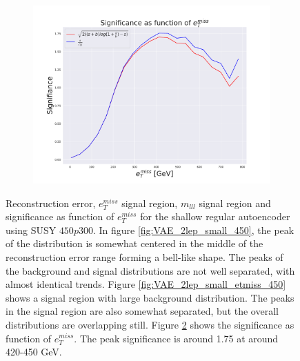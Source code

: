 \begin{figure}[H]
    \hfill  
    \begin{subfigure}{.50\textwidth}
        \includegraphics[width=\textwidth]{Figures/VAE_testing/small/2lep/significance_etmiss_450p0p0300_-0.8484803499636524.pdf}
        \caption{}
        \label{fig:VAE_2lep_small_signi_450}
    \end{subfigure}
    \hfill      
    \caption[2lep shallow network | $450p300$ | VAE]{Reconstruction error, $e_T^{miss}$ signal region, $m_{lll}$ signal region and significance as function of 
    $e_T^{miss}$ for the shallow regular autoencoder using SUSY $450p300$.
    In figure \ref{fig:VAE_2lep_small_450},  the peak of the distribution is somewhat centered in the middle 
of the reconstruction error range forming a bell-like shape. The peaks of the background and signal 
distributions are not well separated, with almost identical trends. Figure 
\ref{fig:VAE_2lep_small_etmiss_450}
shows a signal region with large background distribution. The peaks in the signal region are also somewhat 
separated, but the overall distributions are overlapping still. 
Figure \ref{fig:VAE_2lep_small_rec_sig_signi_450} shows the significance as function of $e_T^{miss}$. 
The peak significance is around 1.75 at around 420-450 GeV.}
    \label{fig:VAE_2lep_small_rec_sig_signi_450}
\end{figure}



